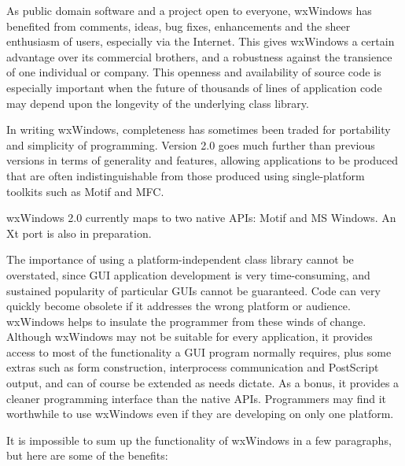 As public domain software and a project open to everyone, wxWindows has
benefited from comments, ideas, bug fixes, enhancements and the sheer
enthusiasm of users, especially via the Internet. This gives wxWindows a
certain advantage over its commercial brothers, and a robustness against
the transience of one individual or company. This openness and
availability of source code is especially important when the future of
thousands of lines of application code may depend upon the longevity of
the underlying class library.

In writing wxWindows, completeness has sometimes been traded for
portability and simplicity of programming. Version 2.0 goes much
further than previous versions in terms of generality and features,
allowing applications to be produced
that are often indistinguishable from those produced using single-platform
toolkits
such as Motif and MFC.

wxWindows 2.0 currently maps to two native APIs: Motif and
MS Windows. An Xt port is also in preparation.

The importance of using a platform-independent class library cannot be
overstated, since GUI application development is very time-consuming,
and sustained popularity of particular GUIs cannot be guaranteed.
Code can very quickly become obsolete if it addresses the wrong
platform or audience.  wxWindows helps to insulate the programmer from
these winds of change. Although wxWindows may not be suitable for
every application, it provides access to most of the functionality a
GUI program normally requires, plus some extras such as form
construction, interprocess communication and PostScript output, and
can of course be extended as needs dictate.  As a bonus, it provides
a cleaner programming interface than the native
APIs. Programmers may find it worthwhile to use wxWindows even if they
are developing on only one platform.

It is impossible to sum up the functionality of wxWindows in a few paragraphs, but
here are some of the benefits:

